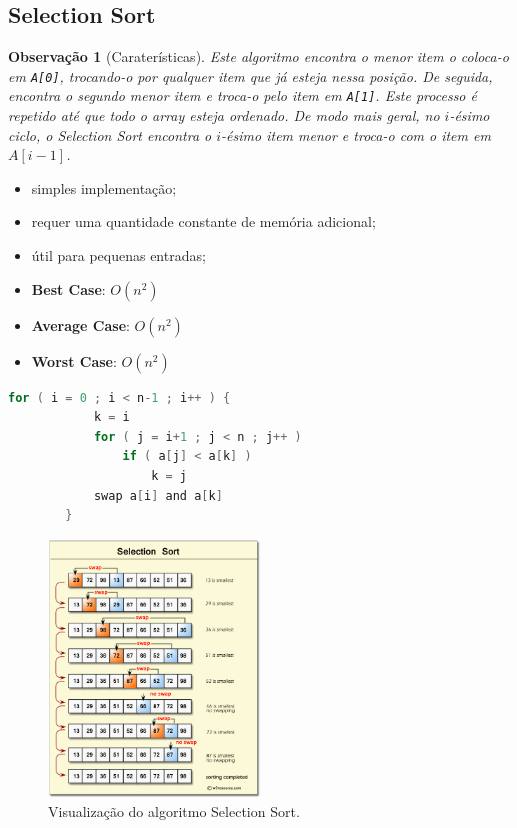 \documentclass[a4paper, 12pt]{article}
\newtheorem{remark}{Observação}
\begin{document}
\subsection{Selection Sort}
\begin{remark}[Caraterísticas]
    Este algoritmo encontra o menor item o coloca-o em \texttt{A[0]}, trocando-o por qualquer item que já esteja nessa posição. De seguida, encontra o segundo menor item e troca-o pelo item em \texttt{A[1]}. Este processo é repetido até que todo o array esteja ordenado.
    De modo mais geral, no $i$-ésimo ciclo, o Selection Sort encontra o $i$-ésimo item menor e troca-o com o item em $A[i-1]$.\end{remark}
    \begin{itemize}
        \item simples implementação;
        \item requer uma quantidade constante de memória adicional;
        \item útil para pequenas entradas;
        \item \textbf{Best Case}: $O(n^2)$
        \item \textbf{Average Case}: $O(n^2)$
        \item \textbf{Worst Case}: $O(n^2)$
    \end{itemize}


\begin{center}
    \begin{lstlisting}[frame=single, language=c, caption=Algoritmo Selection Sort, captionpos=b]
        for ( i = 0 ; i < n-1 ; i++ ) {
            k = i
            for ( j = i+1 ; j < n ; j++ )
                if ( a[j] < a[k] )
                    k = j
            swap a[i] and a[k]
        }          
    \end{lstlisting}
    
    \begin{figure}[h]
        \centering
        \includegraphics[width=0.5\textwidth]{fig/ao/ss.png}
        \caption{Visualização do algoritmo Selection Sort.}
    \end{figure}
\end{center}
\end{document}
